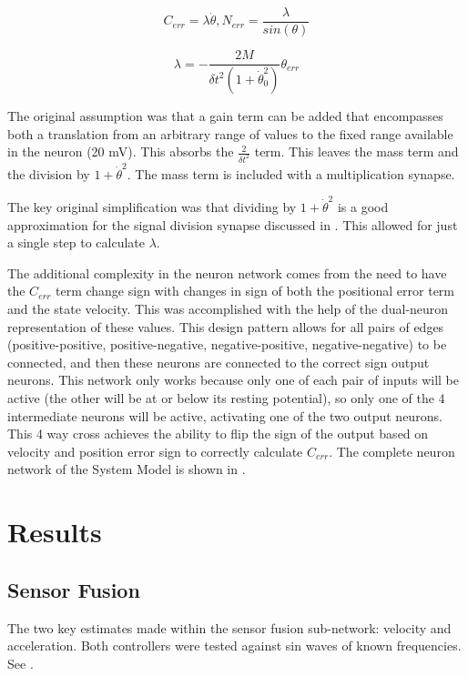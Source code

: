 \documentclass[letterpaper, 10 pt, conference]{IEEEconf} %
\newcommand{\myref}[1]{\hyperref[#1]{\Cref{#1}}}
\newcommand{\bbs}[1]{\section{#1}}
\newcommand{\bbss}[1]{\subsection{#1}}
\begin{document}
\begin{equation}
C_{err} = \lambda \dot{\theta}, N_{err} = \dfrac{\lambda}{sin(\theta)}
\end{equation}

\begin{equation}
\lambda 
=
- \dfrac{2M}{\delta t^{2} (1 + \dot{\theta}_{0}^{2})} \theta_{err}
\end{equation}

The original assumption was that a gain term can be added that encompasses both a translation from an arbitrary range of values to the fixed range available in the neuron (20 mV). This absorbs the $\frac{2}{\delta t^{2}}$ term. This leaves
the mass term and the division by $1 + \dot{\theta}^{2}$. The mass term is included with a multiplication synapse. 

The key original simplification was that
dividing by $1 + \dot{\theta}^{2}$ is a good approximation for the signal division synapse discussed in \cite{NickFunctionalSubnetwork}. This allowed for
just a single step to calculate $\lambda$.

The additional complexity in the neuron network comes from the need to have the $C_{err}$ term change sign with changes in sign of both the positional error term and the state velocity. This was accomplished with the help of the dual-neuron representation of these values. This design pattern allows for all pairs of edges (positive-positive, positive-negative, negative-positive, negative-negative) to be connected, and then these neurons are connected to the correct sign output neurons. This network only works because only one of each pair of inputs will be active (the other will be at or below its resting potential), so only one of the 4 intermediate neurons will be active, activating one of the two output neurons. This 4 way cross achieves the ability to flip the sign of the output based on velocity and position error sign to correctly calculate $C_{err}$. The complete neuron network of the System Model is shown in \myref{fig:NeuronSystemModel}.

\bbs{Results}
\label{chap:results}

\bbss{Sensor Fusion}

The two key estimates made within the sensor fusion sub-network: velocity and
acceleration. Both controllers were tested against sin waves of known
frequencies. See \myref{fig:TestVel}.

\end{document}
